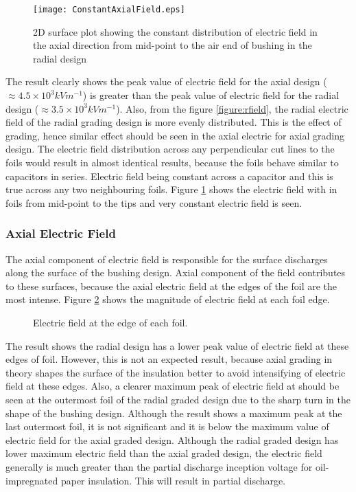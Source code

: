 \begin{figure}[!h]
\centering
\texttt{[image: ConstantAxialField.eps]}
\caption{2D surface plot showing the constant distribution of electric field in the axial direction from mid-point to the air end of bushing in the radial design}
\label{figure:constantfield}
\end{figure}
The result clearly shows the peak value of electric field for the axial design ($\approx 4.5 \times 10^3 kVm^{-1}$) is greater than the peak value of electric field for the radial design ($\approx 3.5 \times 10^3 kVm^{-1}$). Also, from the figure \ref{figure:rfield}, the radial electric field of the radial grading design is more evenly distributed. This is the effect of grading, hence similar effect should be seen in the axial electric for axial grading design. The electric field distribution across any perpendicular cut lines to the foils would result in almost identical results, because the foils behave similar to capacitors in series. Electric field being constant across a capacitor and this is true across any two neighbouring foils. Figure \ref{figure:constantfield} shows the electric field with in foils from mid-point to the tips and very constant electric field is seen.



\subsubsection{Axial Electric Field}
The axial component of electric field is responsible for the surface discharges along the surface of the bushing design. Axial component of the field contributes to these surfaces, because the axial electric field at the edges of the foil are the most intense. Figure \ref{figure:afield} shows the magnitude of electric field at each foil edge. 

\begin{figure}[!h]
\centering
{}
\caption{Electric field at the edge of each foil.}
\label{figure:afield}
\end{figure}

The result shows the radial design has a lower peak value of electric field at these edges of foil. However, this is not an expected result, because axial grading in theory shapes the surface of the insulation better to avoid intensifying of electric field at these edges. Also, a clearer maximum peak of electric field at should be seen at the outermost foil of the radial graded design due to the sharp turn in the shape of the bushing design. Although the result shows a maximum peak at the last outermost foil, it is not significant and it is below the maximum value of electric field for the axial graded design. Although the radial graded design has lower maximum electric field than the axial graded design, the electric field generally is much greater than the partial discharge inception voltage for oil-impregnated paper insulation. This will result in partial discharge.

